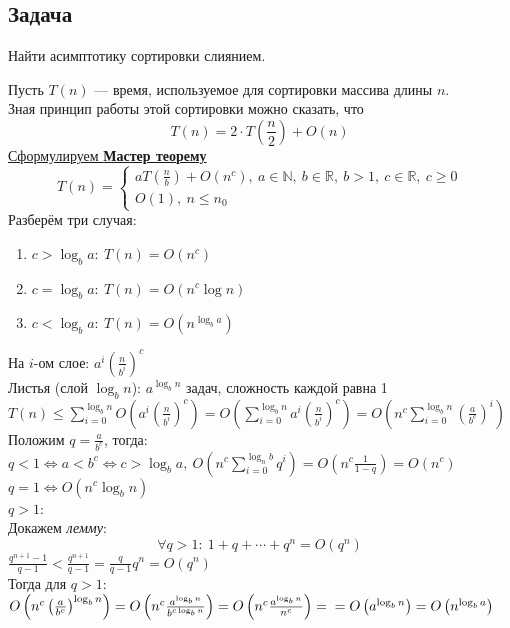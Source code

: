 \documentclass[12pt, a4paper]{article}
\begin{document}
    \subsection*{Задача}
    Найти асимптотику сортировки слиянием.\par
    Пусть $T(n)$ --- время, используемое для сортировки массива длины $n$.\\
    Зная принцип работы этой сортировки можно сказать, что
    \[T(n) = 2\cdot T\left(\frac{n}{2}\right) + O(n)\]
    \underline{Сформулируем \textbf{Мастер теорему}}\label{sec:MasterTh}
    \[T(n) = \begin{cases}
        aT\left(\frac{n}{b}\right) + O(n^c),\ a\in \mathbb{N},\ b\in \mathbb{R},\ b>1,\ c\in \mathbb{R},\ c\geq 0\\
        O(1),\ n\leq n_0
    \end{cases}\]
    Разберём три случая:
    \begin{enumerate}
        \item $c > \log_b a:\ T(n) = O(n^c)$
        \item $c = \log_b a:\ T(n) = O(n^c\log n)$
        \item $c < \log_b a:\ T(n) = O(n^{\log_b a})$
    \end{enumerate}
    На $i$-ом слое: $a^i\left(\frac{n}{b^i}\right)^c$\\
    Листья (слой $\log_b n$): $a^{\log_b n}$ задач, сложность каждой равна 1\\
    $T(n) \leq \displaystyle \sum_{i = 0}^{\log_b n} O \left(a^i\left( \frac{n}{b^i} \right)^c\right) = O\left( \sum_{i = 0}^{\log_b n} a^i \left( \frac{n}{b^i} \right)^c \right) = O\left( n^c \sum_{i = 0}^{\log_b n} \left( \frac{a}{b^c}  \right)^i \right)$\\
    Положим $q = \frac{a}{b^c}$, тогда:\\
    $q < 1\Leftrightarrow a < b^c\Leftrightarrow c > \log_b a,\ \displaystyle O\left(n^c \sum_{i = 0}^{\log_n b} q^i\right) = O\left(n^c \frac{1}{1 - q}\right) = O\left(n^c\right)$\\
    $q = 1\Leftrightarrow O(n^c \log_b n)$\\
    $q > 1$:\\
    Докажем \textit{лемму}:
    \[\forall q > 1:\ 1 + q + \cdots + q^n = O(q^n)\]
    $\frac{q^{n + 1} - 1}{q - 1} < \frac{q^{n + 1}}{q - 1} = \frac{q}{q - 1}q^n = O(q^n)$\\
    Тогда для $q > 1$: $O\left(n^c \left( \frac{a}{b^c} \right)^{\log_b n} \right) = O\left( n^c \frac{a^{\log_b n}}{b^{c\log_b n}} \right) = O\left( n^c \frac{a^{\log_b n}}{n^c} \right) =\\
    = O\left( a^{\log_b n} \right) = O\left( n^{\log_b a} \right)$
\end{document}
